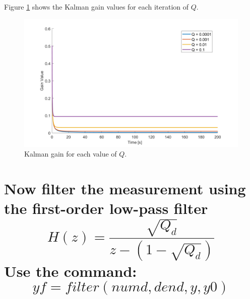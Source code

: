 \documentclass[12pt,letterpaper, onecolumn]{exam}
\begin{document}
\begin{questions}
\begin{parts}
{            Figure \ref{fig:7} shows the Kalman gain values for each iteration of $Q$.

            \begin{figure}[!ht]
                \centering
                \includegraphics[width=\linewidth]{Q2b_gains.png}
                \caption{Kalman gain for each value of $Q$.}
                \label{fig:7}
            \end{figure}
        }
        \clearpage

        \part{Now filter the measurement using the first-order low-pass filter
            \[H(z)=  \frac{\sqrt{Q_d}}{z - \left(1 - \sqrt{Q_d}\right)} \]
            Use the command:
            \[yf = filter(numd,dend,y,y0)\]}

        \clearpage

\end{parts}
\end{questions}
\end{document}
